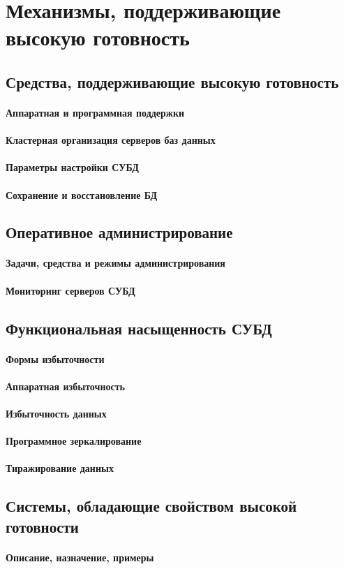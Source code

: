 \section{Механизмы, поддерживающие высокую готовность}

\subsection{Средства, поддерживающие высокую готовность}
\paragraph{Аппаратная и программная поддержки}
\paragraph{Кластерная организация серверов баз данных}
\paragraph{Параметры настройки СУБД}
\paragraph{Сохранение и восстановление БД}

\subsection{Оперативное администрирование}
\paragraph{Задачи, средства и режимы администрирования}
\paragraph{Мониторинг серверов СУБД}

\subsection{Функциональная насыщенность СУБД}
\paragraph{Формы избыточности}
\paragraph{Аппаратная избыточность}
\paragraph{Избыточность данных}
\paragraph{Программное зеркалирование}
\paragraph{Тиражирование данных}

\subsection{Системы, обладающие свойством высокой готовности}
\paragraph{Описание, назначение, примеры}